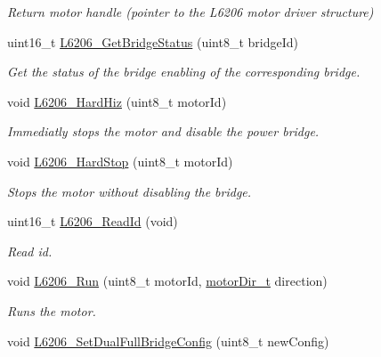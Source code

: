 \begin{DoxyCompactItemize}
\begin{DoxyCompactList}\small\item\em Return motor handle (pointer to the L6206 motor driver structure) \end{DoxyCompactList}\item 
uint16\+\_\+t \mbox{\hyperlink{group___l6206___exported___functions_gae81e6ca6cb60e241433a05c832cea4c3}{L6206\+\_\+\+Get\+Bridge\+Status}} (uint8\+\_\+t bridge\+Id)
\begin{DoxyCompactList}\small\item\em Get the status of the bridge enabling of the corresponding bridge. \end{DoxyCompactList}\item 
void \mbox{\hyperlink{group___l6206___exported___functions_gaf6831d9247cb27710fd2e4b782e3e4b7}{L6206\+\_\+\+Hard\+Hiz}} (uint8\+\_\+t motor\+Id)
\begin{DoxyCompactList}\small\item\em Immediatly stops the motor and disable the power bridge. \end{DoxyCompactList}\item 
void \mbox{\hyperlink{group___l6206___exported___functions_ga89661968f456ec5778f6290c1a4681f1}{L6206\+\_\+\+Hard\+Stop}} (uint8\+\_\+t motor\+Id)
\begin{DoxyCompactList}\small\item\em Stops the motor without disabling the bridge. \end{DoxyCompactList}\item 
uint16\+\_\+t \mbox{\hyperlink{group___l6206___exported___functions_ga853fd3a4a008922950a77d5988633549}{L6206\+\_\+\+Read\+Id}} (void)
\begin{DoxyCompactList}\small\item\em Read id. \end{DoxyCompactList}\item 
void \mbox{\hyperlink{group___l6206___exported___functions_gafc7601e986586d361a66bc38687fd56c}{L6206\+\_\+\+Run}} (uint8\+\_\+t motor\+Id, \mbox{\hyperlink{group___device___direction___options_ga4eaf4196e4d11d552f58f3fab218a8c7}{motor\+Dir\+\_\+t}} direction)
\begin{DoxyCompactList}\small\item\em Runs the motor. \end{DoxyCompactList}\item 
void \mbox{\hyperlink{group___l6206___exported___functions_ga5c4892c39f6d5898198d8e3557b14247}{L6206\+\_\+\+Set\+Dual\+Full\+Bridge\+Config}} (uint8\+\_\+t new\+Config)

\end{DoxyCompactItemize}
